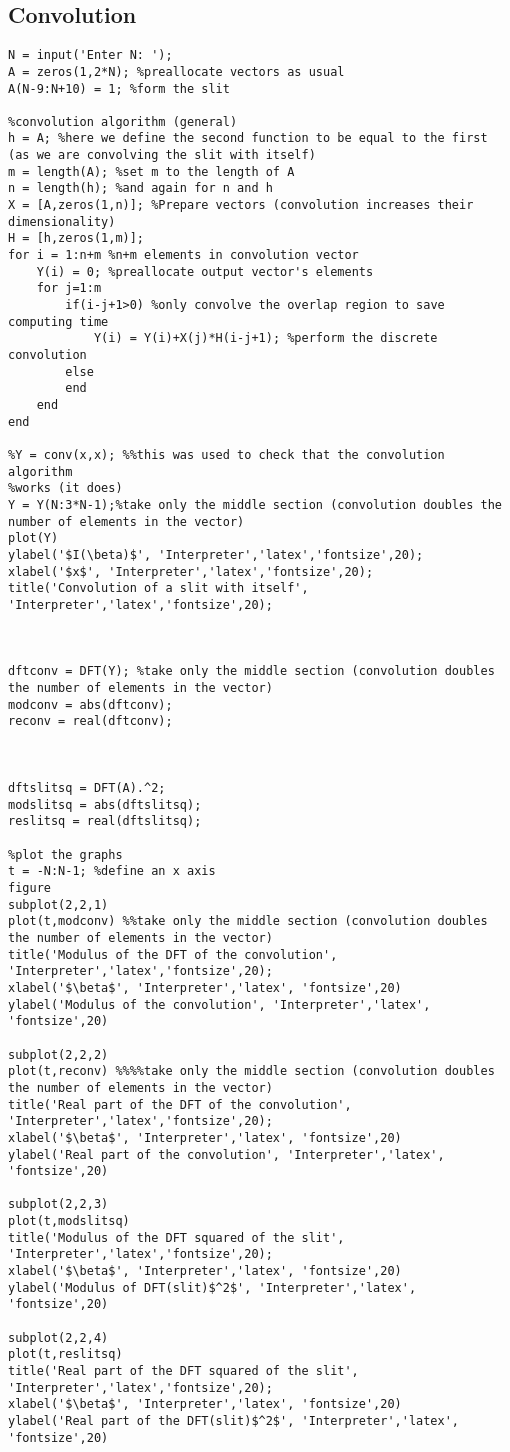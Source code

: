 \documentclass[a4paper,11pt]{article}
\begin{document}
\subsection{Convolution}
\begin{lstlisting}[style=matlab-editor]
N = input('Enter N: ');
A = zeros(1,2*N); %preallocate vectors as usual
A(N-9:N+10) = 1; %form the slit 

%convolution algorithm (general)
h = A; %here we define the second function to be equal to the first (as we are convolving the slit with itself)
m = length(A); %set m to the length of A
n = length(h); %and again for n and h
X = [A,zeros(1,n)]; %Prepare vectors (convolution increases their dimensionality)
H = [h,zeros(1,m)];
for i = 1:n+m %n+m elements in convolution vector
    Y(i) = 0; %preallocate output vector's elements
    for j=1:m
        if(i-j+1>0) %only convolve the overlap region to save computing time
            Y(i) = Y(i)+X(j)*H(i-j+1); %perform the discrete convolution
        else
        end
    end
end

%Y = conv(x,x); %%this was used to check that the convolution algorithm
%works (it does)
Y = Y(N:3*N-1);%take only the middle section (convolution doubles the number of elements in the vector)
plot(Y)
ylabel('$I(\beta)$', 'Interpreter','latex','fontsize',20);
xlabel('$x$', 'Interpreter','latex','fontsize',20);
title('Convolution of a slit with itself', 'Interpreter','latex','fontsize',20);



dftconv = DFT(Y); %take only the middle section (convolution doubles the number of elements in the vector)
modconv = abs(dftconv);
reconv = real(dftconv);



dftslitsq = DFT(A).^2;
modslitsq = abs(dftslitsq);
reslitsq = real(dftslitsq);

%plot the graphs
t = -N:N-1; %define an x axis
figure
subplot(2,2,1)
plot(t,modconv) %%take only the middle section (convolution doubles the number of elements in the vector)
title('Modulus of the DFT of the convolution', 'Interpreter','latex','fontsize',20);
xlabel('$\beta$', 'Interpreter','latex', 'fontsize',20)
ylabel('Modulus of the convolution', 'Interpreter','latex', 'fontsize',20)

subplot(2,2,2)
plot(t,reconv) %%%%take only the middle section (convolution doubles the number of elements in the vector)
title('Real part of the DFT of the convolution', 'Interpreter','latex','fontsize',20);
xlabel('$\beta$', 'Interpreter','latex', 'fontsize',20)
ylabel('Real part of the convolution', 'Interpreter','latex', 'fontsize',20)

subplot(2,2,3)
plot(t,modslitsq)
title('Modulus of the DFT squared of the slit', 'Interpreter','latex','fontsize',20);
xlabel('$\beta$', 'Interpreter','latex', 'fontsize',20)
ylabel('Modulus of DFT(slit)$^2$', 'Interpreter','latex', 'fontsize',20)

subplot(2,2,4)
plot(t,reslitsq)
title('Real part of the DFT squared of the slit', 'Interpreter','latex','fontsize',20);
xlabel('$\beta$', 'Interpreter','latex', 'fontsize',20)
ylabel('Real part of the DFT(slit)$^2$', 'Interpreter','latex', 'fontsize',20)
\end{lstlisting}
\end{document}
